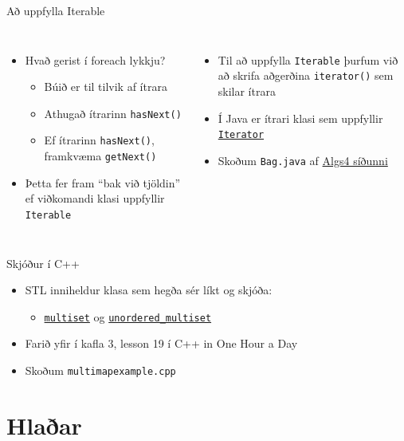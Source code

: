 \documentclass{beamer}
\begin{document}
\begin{frame}{Að uppfylla Iterable}
	\begin{columns}
		\begin{itemize}
			\item Hvað gerist í foreach lykkju?
			      \begin{itemize}
				      \item Búið er til tilvik af ítrara
				      \item Athugað ítrarinn \texttt{hasNext()}
				      \item Ef ítrarinn \texttt{hasNext()}, framkvæma \texttt{getNext()}
			      \end{itemize}
			\item Þetta fer fram ``bak við tjöldin'' ef viðkomandi klasi uppfyllir \texttt{Iterable}
		\end{itemize}
		\begin{itemize}
			\item Til að uppfylla \texttt{Iterable} þurfum við að skrifa aðgerðina \texttt{iterator()} sem skilar ítrara
			\item Í Java er ítrari klasi sem uppfyllir \href{https://docs.oracle.com/javase/8/docs/api/java/util/Iterator.html}{\texttt{Iterator}}
			\item Skoðum \texttt{Bag.java} af \href{https://algs4.cs.princeton.edu/code/}{Algs4 síðunni}
		\end{itemize}
	\end{columns}
\end{frame}

\begin{frame}{Skjóður í C++}
	\begin{itemize}
		\item STL inniheldur klasa sem hegða sér líkt og skjóða:
		      \begin{itemize}
			      \item \texttt{\href{http://www.cplusplus.com/reference/set/multiset/}{multiset}} og \texttt{\href{http://www.cplusplus.com/reference/unordered_set/unordered\_multiset/}{unordered\_multiset}}
		      \end{itemize}
		\item Farið yfir í kafla 3, lesson 19 í C++ in One Hour a Day
		\item Skoðum \texttt{multimapexample.cpp}
	\end{itemize}
\end{frame}

\section{Hlaðar}
\end{document}
